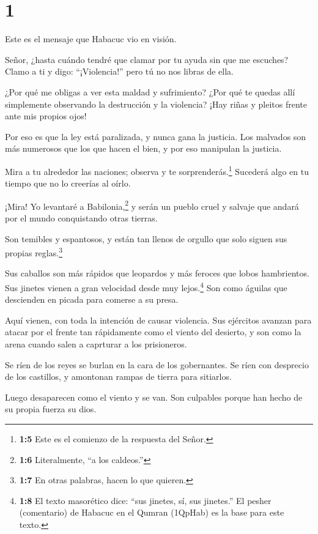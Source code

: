 \hypertarget{section}{%
\section{1}\label{section}}

 Este es el mensaje que Habacuc vio en visión.

 Señor, ¿hasta cuándo tendré que clamar por tu ayuda sin que
me escuches? Clamo a ti y digo: ``¡Violencia!'' pero tú no nos libras de
ella.

 ¿Por qué me obligas a ver esta maldad y sufrimiento? ¿Por
qué te quedas allí simplemente observando la destrucción y la violencia?
¡Hay riñas y pleitos frente ante mis propios ojos!

 Por eso es que la ley está paralizada, y nunca gana la
justicia. Los malvados son más numerosos que los que hacen el bien, y
por eso manipulan la justicia.

 Mira a tu alrededor las naciones; observa y te
sorprenderás.\footnote{\textbf{1:5} Este es el comienzo de la respuesta
  del Señor.} Sucederá algo en tu tiempo que no lo creerías al oírlo.

 ¡Mira! Yo levantaré a Babilonia,\footnote{\textbf{1:6}
  Literalmente, ``a los caldeos.''} y serán un pueblo cruel y salvaje
que andará por el mundo conquistando otras tierras.

 Son temibles y espantosos, y están tan llenos de orgullo
que solo siguen sus propias reglas.\footnote{\textbf{1:7} En otras
  palabras, hacen lo que quieren.}

 Sus caballos son más rápidos que leopardos y más feroces
que lobos hambrientos. Sus jinetes vienen a gran velocidad desde muy
lejos.\footnote{\textbf{1:8} El texto masorético dice: ``sus jinetes,
  sí, sus jinetes.'' El pesher (comentario) de Habacuc en el Qumran
  (1QpHab) es la base para este texto.} Son como águilas que descienden
en picada para comerse a su presa.

 Aquí vienen, con toda la intención de causar violencia. Sus
ejércitos avanzan para atacar por el frente tan rápidamente como el
viento del desierto, y son como la arena cuando salen a caprturar a los
prisioneros.

 Se ríen de los reyes se burlan en la cara de los
gobernantes. Se ríen con desprecio de los castillos, y amontonan rampas
de tierra para sitiarlos.

 Luego desaparecen como el viento y se van. Son culpables
porque han hecho de su propia fuerza su dios.

